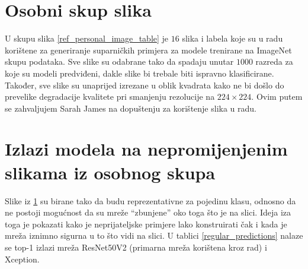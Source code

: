 \documentclass[utf8, diplomski]{fer}
\begin{document}
\section{Osobni skup slika}\label{osobni_skup}
U skupu slika \ref{ref_personal_image_table} je $16$ slika i labela koje su u radu korištene za generiranje suparničkih primjera za modele trenirane na ImageNet skupu podataka. Sve slike su odabrane tako da spadaju unutar $1000$ razreda za koje su modeli predviđeni, dakle slike bi trebale biti ispravno klasificirane. Također, sve slike su unaprijed izrezane u oblik kvadrata kako ne bi došlo do prevelike degradacije kvalitete pri smanjenju rezolucije na $224\times224$. Ovim putem se zahvaljujem Sarah James na dopuštenju za korištenje slika u radu.

\section{Izlazi modela na nepromijenjenim slikama iz osobnog skupa}
Slike iz \ref{osobni_skup} su birane tako da budu reprezentativne za pojedinu klasu, odnosno da ne postoji mogućnost da su mreže ``zbunjene'' oko toga što je na slici. Ideja iza toga je pokazati kako je neprijateljske primjere lako konstruirati čak i kada je mreža iznimno sigurna u to što vidi na slici. U tablici \ref{regular_predictions} nalaze se top-1 izlazi mreža ResNet50V2 (primarna mreža korištena kroz rad) i Xception.
\\
\bgroup
\def\arraystretch{1.2}
\end{document}
